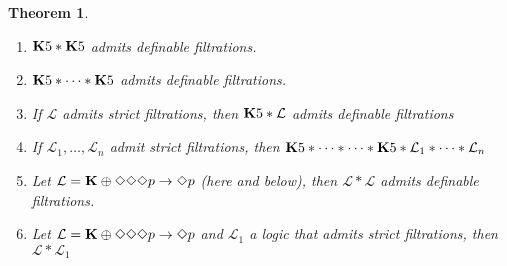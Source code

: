 \documentclass[a4paper]{article}
\theoremstyle{defin}
\theoremstyle{theorem}
\newtheorem{theorem}{Theorem}
\theoremstyle{prop}
\theoremstyle{lemma}
\theoremstyle{fact}
\theoremstyle{ex}
\theoremstyle{col}
\theoremstyle{claim}
\begin{document}
\begin{theorem}
  $ $

  \begin{enumerate}
  \item ${\bf K}5 * {\bf K}5$ admits definable filtrations.
  \item ${\bf K}5 * \dots * {\bf K}5$ admits definable filtrations.
  \item If $\mathcal{L}$ admits strict filtrations, then ${\bf K}5 * \mathcal{L}$ admits definable filtrations
  \item If $\mathcal{L}_1, \dots, \mathcal{L}_n$ admit strict filtrations, then ${\bf K}5 * \dots * \dots * {\bf K}5 * \mathcal{L}_1 * \dots * \mathcal{L}_n$
  \item Let $\mathcal{L} = {\bf K} \oplus \Diamond \Diamond \Diamond p \to \Diamond p$  (here and below), then $\mathcal{L} * \mathcal{L}$ admits definable filtrations.
  \item Let $\mathcal{L} = {\bf K} \oplus \Diamond \Diamond \Diamond p \to \Diamond p$ and $\mathcal{L}_1$ a logic that admits strict filtrations, then $\mathcal{L} * \mathcal{L}_1$
  \end{enumerate}
\end{theorem}
\end{document}
